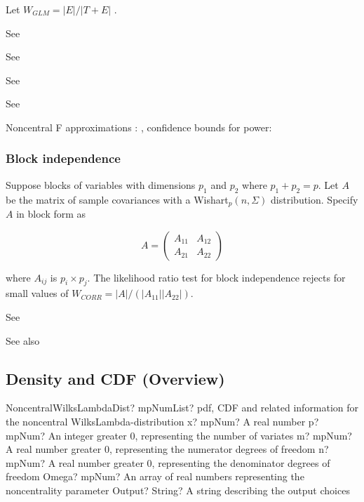 Let $W_{GLM} = | E | / | T + E |$ .

See \cite{OBrien1992}

See \cite{lee_results_1972}

See \cite{lee_asymptotic_1971}

See \cite{Kulp_1984}

Noncentral F approximations : \cite{Muller_1992} , confidence bounds for power: \cite{Taylor_1995}

\subsubsection{Block independence}
\label{WilksLambdaDistributionDefinition_CORR}
Suppose blocks of variables with dimensions $p_1$ and $p_2$ where $p_1 + p_2 = p$.
Let $A$ be the matrix of sample covariances with a Wishart${}_p (n,\Sigma)$ distribution.
Specify $A$ in block form as

\begin{equation}
	A = \begin{pmatrix}
		A_{11} & A_{12}  \\
		A_{21} & A_{22} 
	\end{pmatrix}
\end{equation}

where $A_{ij}$ is $p_i \times p_j$. The likelihood ratio test for block independence rejects for small values of $W_{CORR} = |A|/(|A_{11}||A_{22}|)$.


See \cite{lee_distribution_1971}

See also \cite{Butler2005}




\subsection{Density and CDF (Overview)}

\begin{mpFunctionsExtract}
	\mpFunctionSixNotImplemented
	{NoncentralWilksLambdaDist? mpNumList? pdf, CDF and related information for the noncentral WilksLambda-distribution}
	{x? mpNum? A real number}
	{p? mpNum? An integer greater 0, representing the number of variates}
	{m? mpNum? A real number greater 0, representing the numerator  degrees of freedom}
	{n? mpNum? A real number greater 0, representing the denominator degrees of freedom}
	{Omega? mpNum? An array of real numbers representing the noncentrality parameter}
	{Output? String? A string describing the output choices}
\end{mpFunctionsExtract}


